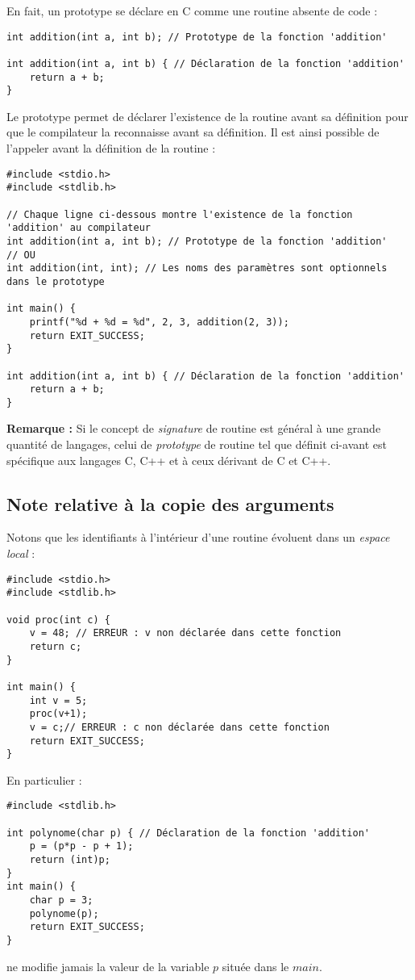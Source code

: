 \documentclass[../../../main.tex]{subfiles}
\begin{document}
En fait, un prototype se déclare en C comme une routine absente de code :
\begin{verbatim}
int addition(int a, int b); // Prototype de la fonction 'addition'

int addition(int a, int b) { // Déclaration de la fonction 'addition'
	return a + b;
}
\end{verbatim}
Le prototype permet de déclarer l'existence de la routine avant sa définition pour que le compilateur la reconnaisse avant sa définition. Il est ainsi possible de l'appeler avant la définition de la routine :
\begin{verbatim}
#include <stdio.h>
#include <stdlib.h>

// Chaque ligne ci-dessous montre l'existence de la fonction 'addition' au compilateur
int addition(int a, int b); // Prototype de la fonction 'addition'
// OU
int addition(int, int); // Les noms des paramètres sont optionnels dans le prototype

int main() {
	printf("%d + %d = %d", 2, 3, addition(2, 3));
	return EXIT_SUCCESS;
}

int addition(int a, int b) { // Déclaration de la fonction 'addition'
	return a + b;
}
\end{verbatim}
 
\textbf{Remarque :} Si le concept de \textit{signature} de routine est général à une grande quantité de langages, celui de \textit{prototype} de routine tel que définit ci-avant est spécifique aux langages C, C++ et à ceux dérivant de C et C++.
\subsection{Note relative à la copie des arguments}
Notons que les identifiants à l'intérieur d'une routine évoluent dans un \textit{espace local} :
\begin{verbatim}
#include <stdio.h>
#include <stdlib.h>

void proc(int c) {
	v = 48; // ERREUR : v non déclarée dans cette fonction
	return c;
}

int main() {
	int v = 5;
	proc(v+1);
	v = c;// ERREUR : c non déclarée dans cette fonction
	return EXIT_SUCCESS;
}
\end{verbatim}
En particulier :
\begin{verbatim}
#include <stdlib.h>

int polynome(char p) { // Déclaration de la fonction 'addition'
	p = (p*p - p + 1);
	return (int)p;
}
int main() {
	char p = 3;
	polynome(p);
	return EXIT_SUCCESS;
}
\end{verbatim}
ne modifie jamais la valeur de la variable $p$ située dans le $main$.
 
\end{document}
